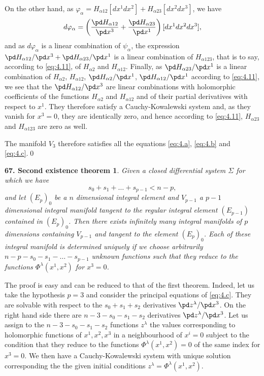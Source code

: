 On the other hand, as $\varphi_{\alpha}=H_{\alpha 12}[dx^{1}dx^{2}]+H_{\alpha 23}[dx^{2}dx^{3}]$, we have
\[
d\varphi_{\alpha}=\left(\frac{\pd H_{\alpha 12}}{\pd x^{3}}+\frac{\pd H_{\alpha 23}}{\pd x^{1}}\right)[dx^{1}dx^{2}dx^{3}],
\]
and as $d\varphi_{\alpha}$ is a linear combination of $\psi_{\alpha}$, the expression $\pd H_{\alpha 12}/\pd x^{3}+\pd H_{\alpha 23}/\pd x^{1}$ is a linear combination of $H_{\alpha 123}$, that is to say, according to \eqref{eq:4.11}, of $H_{\alpha 2}$ and $H_{\alpha 12}$. Finally, as $\pd H_{\alpha 23}/\pd x^{1}$ is a linear combination of $H_{\alpha 2}$, $H_{\alpha 12}$, $\pd H_{\alpha 2}/\pd x^{1}$, $\pd H_{\alpha 12}/\pd x^{1}$ according to \eqref{eq:4.11}, we see that the $\pd H_{\alpha 12}/\pd x^{3}$ are linear combinations with holomorphic coefficients of the functions $H_{\alpha 2}$ and $H_{\alpha 12}$ and of their partial derivatives with respect to $x^{1}$. They therefore satisfy a Cauchy-Kowalewski system and, as they vanish for $x^{3}=0$, they are identically zero, and hence according to \eqref{eq:4.11}, $H_{\alpha 23}$ and $H_{\alpha 123}$ are zero as well.

The manifold $V_{3}$ therefore satisfies all the equations \eqref{eq:4.a}, \eqref{eq:4.b} and \eqref{eq:4.c}.\qed


\vspace{12pt}\addtocounter{frenchsec}{1}
\theoremstyle{shape1}
\newtheorem*{thm67}{\hspace{15pt}\textbf{67.} Second existence theorem}
\begin{thm67}
  Given a closed differential system $\Sigma$ for which we have
\[
s_{0}+s_{1}+\dots+s_{p-1}<n-p,
\]
and let $(E_{p})_{0}$ be a $n$ dimensional integral element and $V_{p-1}$ a $p-1$ dimensional integral manifold tangent to the regular integral element $(E_{p-1})$ contained in $(E_{p})_{0}$. Then there exists infinitely many integral manifolds of $p$ dimensions containing $V_{p-1}$ and tangent to the element $(E_{p})_{0}$. Each of these integral manifold is determined uniquely if we choose arbitrarily $n-p-s_{0}-s_{1}-\dots-s_{p-1}$ unknown functions such that they reduce to the functions $\Phi^{\lambda}(x^{1},x^{2})$ for $x^{3}=0$.
\end{thm67}

The proof is easy and can be reduced to that of the first theorem. Indeed, let us take the hypothesis $p=3$ and consider the principal equations of \eqref{eq:4.c}. They are solvable with respect to the $s_{0}+s_{1}+s_{2}$ derivatives $\pd z^{\lambda}/\pd x^{3}$. On the right hand side there are $n-3-s_{0}-s_{1}-s_{2}$ derivatives $\pd z^{\lambda}/\pd x^{3}$. Let us assign to the $n-3-s_{0}-s_{1}-s_{2}$ functions $z^{\lambda}$ the values corresponding to holomorphic functions of $x^{1},x^{2},x^{3}$ in a neighbourhood of $x^{i}=0$ subject to the  condition that they reduce to the functions $\Phi^{\lambda}(x^{1},x^{2})=0$ of the same index for $x^{3}=0$. We then have a Cauchy-Kowalewski system with unique solution corresponding the the given initial conditions $z^{\lambda}=\Phi^{\lambda}(x^{1},x^{2})$.

